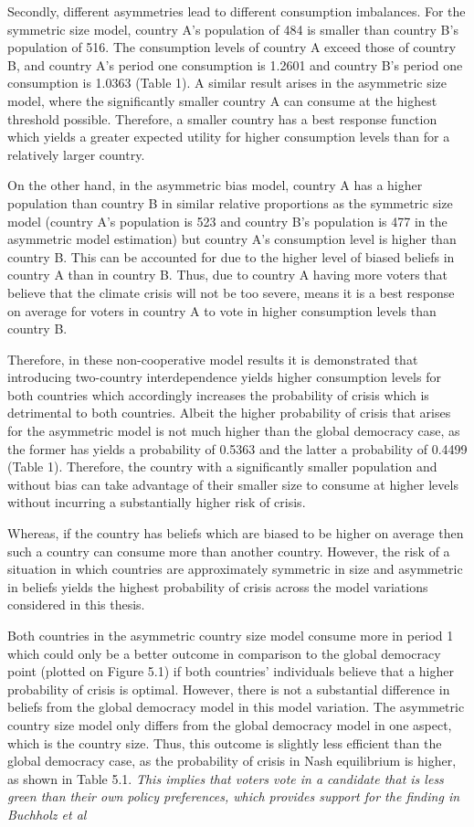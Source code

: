 \documentclass[11pt,preprint, authoryear]{elsarticle}
\numberwithin{equation}{section}
\numberwithin{figure}{section}
\numberwithin{table}{section}
\begin{document}
Secondly, different asymmetries lead to different consumption
imbalances. For the symmetric size model, country A's population of 484
is smaller than country B's population of 516. The consumption levels of
country A exceed those of country B, and country A's period one
consumption is 1.2601 and country B's period one consumption is 1.0363
(Table 1). A similar result arises in the asymmetric size model, where
the significantly smaller country A can consume at the highest threshold
possible. Therefore, a smaller country has a best response function
which yields a greater expected utility for higher consumption levels
than for a relatively larger country.

On the other hand, in the asymmetric bias model, country A has a higher
population than country B in similar relative proportions as the
symmetric size model (country A's population is 523 and country B's
population is 477 in the asymmetric model estimation) but country A's
consumption level is higher than country B. This can be accounted for
due to the higher level of biased beliefs in country A than in country
B. Thus, due to country A having more voters that believe that the
climate crisis will not be too severe, means it is a best response on
average for voters in country A to vote in higher consumption levels
than country B.

Therefore, in these non-cooperative model results it is demonstrated
that introducing two-country interdependence yields higher consumption
levels for both countries which accordingly increases the probability of
crisis which is detrimental to both countries. Albeit the higher
probability of crisis that arises for the asymmetric model is not much
higher than the global democracy case, as the former has yields a
probability of 0.5363 and the latter a probability of 0.4499 (Table 1).
Therefore, the country with a significantly smaller population and
without bias can take advantage of their smaller size to consume at
higher levels without incurring a substantially higher risk of crisis.

Whereas, if the country has beliefs which are biased to be higher on
average then such a country can consume more than another country.
However, the risk of a situation in which countries are approximately
symmetric in size and asymmetric in beliefs yields the highest
probability of crisis across the model variations considered in this
thesis.

Both countries in the asymmetric country size model consume more in
period 1 which could only be a better outcome in comparison to the
global democracy point (plotted on Figure 5.1) if both countries'
individuals believe that a higher probability of crisis is optimal.
However, there is not a substantial difference in beliefs from the
global democracy model in this model variation. The asymmetric country
size model only differs from the global democracy model in one aspect,
which is the country size. Thus, this outcome is slightly less efficient
than the global democracy case, as the probability of crisis in Nash
equilibrium is higher, as shown in Table 5.1. \emph{This implies that
voters vote in a candidate that is less green than their own policy
preferences, which provides support for the finding in Buchholz et al}
\end{document}
